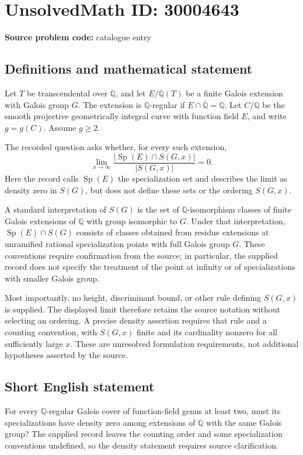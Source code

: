 \documentclass[11pt]{article}
\newcommand{\Q}{\mathbb{Q}}
\begin{document}
\section*{UnsolvedMath ID: 30004643}
\textbf{Source problem code:} catalogue entry
\subsection{Definitions and mathematical statement}
Let \(T\) be transcendental over \(\Q\), and let \(E/\Q(T)\) be a finite Galois extension with Galois group \(G\). The extension is \(\Q\)-regular if \(E\cap\overline{\Q}=\Q\). Let \(C/\Q\) be the smooth projective geometrically integral curve with function field \(E\), and write \(g=g(C)\). Assume \(g\geq 2\).

The recorded question asks whether, for every such extension,
\[
\lim_{x\to\infty}
\frac{\bigl|\operatorname{Sp}(E)\cap S(G,x)\bigr|}
     {\bigl|S(G,x)\bigr|}=0.
\]
Here the record calls \(\operatorname{Sp}(E)\) the specialization set and describes the limit as density zero in \(S(G)\), but does not define these sets or the ordering \(S(G,x)\).

A standard interpretation of \(S(G)\) is the set of \(\Q\)-isomorphism classes of finite Galois extensions of \(\Q\) with group isomorphic to \(G\). Under that interpretation, \(\operatorname{Sp}(E)\cap S(G)\) consists of classes obtained from residue extensions at unramified rational specialization points with full Galois group \(G\). These conventions require confirmation from the source; in particular, the supplied record does not specify the treatment of the point at infinity or of specializations with smaller Galois group.

Most importantly, no height, discriminant bound, or other rule defining \(S(G,x)\) is supplied. The displayed limit therefore retains the source notation without selecting an ordering. A precise density assertion requires that rule and a counting convention, with \(S(G,x)\) finite and its cardinality nonzero for all sufficiently large \(x\). These are unresolved formulation requirements, not additional hypotheses asserted by the source.
\subsection{Short English statement}
For every \(\Q\)-regular Galois cover of function-field genus at least two, must its specializations have density zero among extensions of \(\Q\) with the same Galois group? The supplied record leaves the counting order and some specialization conventions undefined, so the density statement requires source clarification.
\end{document}
